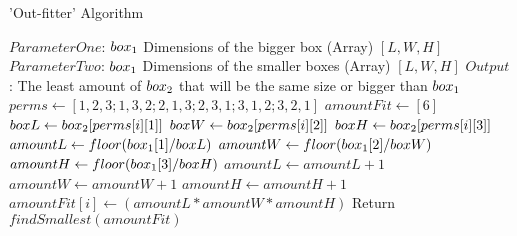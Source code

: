 \documentclass{article}
\begin{document}
	\begin{algorithm}
		\caption{'Out-fitter' Algorithm }
		\begin{algorithmic}[1]
			\State $ParameterOne$: $box\textsubscript{1}$ Dimensions of the bigger box (Array) $[L, W, H]$
			\State $ParameterTwo$: $box\textsubscript{1}$ Dimensions of the smaller boxes (Array) $[L, W, H]$
			\State $Output$: The least amount of $box\textsubscript{2}$ that will  be the same size or bigger than $box\textsubscript{1}$
			\State
			\State $perms \leftarrow [1,2,3;1,3,2;2,1,3;2,3,1;3,1,2;3,2,1]$
			\State $amountFit \leftarrow [6] $
			\State $boxL \leftarrow box\textsubscript{2}[perms[i][1]] $ 
			\State $boxW \leftarrow box\textsubscript{2}[perms[i][2]] $
			\State $boxH \leftarrow box\textsubscript{2}[perms[i][3]] $
			\State 
			\State $amountL \leftarrow floor( box\textsubscript{1}[1]/boxL )$
			\State $amountW \leftarrow floor( box\textsubscript{1}[2]/boxW )$
			\State $amountH \leftarrow floor( box\textsubscript{1}[3]/boxH )$
			\State
			 
			\State $amountL \leftarrow amountL + 1$ 
			\EndIf
			\State $amountW \leftarrow amountW + 1$
			\EndIf
			\State $amountH \leftarrow amountH + 1$
			\EndIf
            \State
			\State $amountFit[i] \leftarrow (amountL * amountW * amountH)$
			\EndFor
			\State Return $findSmallest(amountFit)$ 
			\EndProcedure
		\end{algorithmic}
	\end{algorithm}
	
	
	
	
\end{document}
